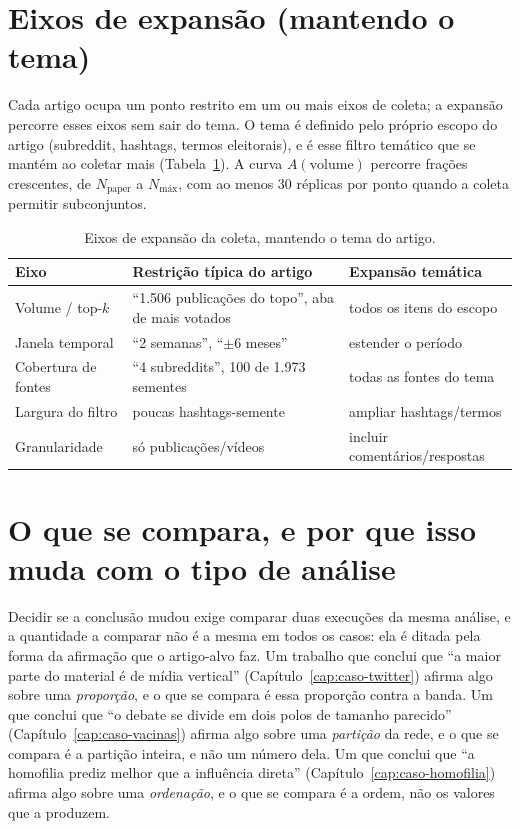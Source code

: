 \section{Eixos de expansão (mantendo o tema)}

Cada artigo ocupa um ponto restrito em um ou mais eixos de coleta; a
expansão percorre esses eixos sem sair do tema. O tema é definido pelo próprio
escopo do artigo (subreddit, hashtags, termos eleitorais), e é esse filtro
temático que se mantém ao coletar mais (Tabela~\ref{tab:eixos}). A curva
$A(\text{volume})$ percorre frações crescentes, de $N_{\text{paper}}$ a
$N_{\text{máx}}$, com ao menos 30 réplicas por ponto quando a coleta permitir
subconjuntos.

\begin{table}[htbp]
\centering
\caption[Eixos de expansão da coleta]{Eixos de expansão da coleta, mantendo o tema do artigo.}
\label{tab:eixos}
\begin{tabular}{lp{4.0cm}p{4.0cm}}
\toprule
Eixo & Restrição típica do artigo & Expansão temática \\
\midrule
Volume / top-$k$    & ``1.506 publicações do topo'', aba de mais votados & todos os itens do escopo \\
Janela temporal     & ``2 semanas'', ``$\pm$6 meses''      & estender o período \\
Cobertura de fontes & ``4 subreddits'', 100 de 1.973 sementes & todas as fontes do tema \\
Largura do filtro   & poucas hashtags-semente      & ampliar hashtags/termos \\
Granularidade       & só publicações/vídeos                       & incluir comentários/respostas \\
\bottomrule
\end{tabular}
\end{table}

\section{O que se compara, e por que isso muda com o tipo de análise}
\label{sec:metricas}

Decidir se a conclusão mudou exige comparar duas execuções da mesma análise, e a
quantidade a comparar não é a mesma em todos os casos: ela é ditada pela forma da
afirmação que o artigo-alvo faz. Um trabalho que conclui que ``a maior parte do
material é de mídia vertical'' (Capítulo~\ref{cap:caso-twitter}) afirma algo
sobre uma \emph{proporção}, e o que se compara é essa proporção contra a banda. Um
que conclui que ``o debate se divide em dois polos de tamanho parecido''
(Capítulo~\ref{cap:caso-vacinas}) afirma algo sobre uma \emph{partição} da rede,
e o que se compara é a partição inteira, e não um número dela. Um que conclui que
``a homofilia prediz melhor que a influência direta''
(Capítulo~\ref{cap:caso-homofilia}) afirma algo sobre uma \emph{ordenação}, e o que
se compara é a ordem, não os valores que a produzem.

